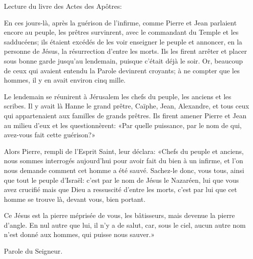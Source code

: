 \indent Lecture du livre des Actes des Apôtres:

En ces jours-là, après la guérison de l’infirme, comme Pierre et Jean parlaient encore au peuple, les prêtres survinrent, avec le commandant du Temple et les sadducéens; ils étaient excédés de les voir enseigner le peuple et annoncer, en la personne de Jésus, la résurrection d’entre les morts. Ils les firent arrêter et placer sous bonne garde jusqu’au lendemain, puisque c’était déjà le soir. Or, beaucoup de ceux qui avaient entendu la Parole devinrent croyants; à ne compter que les hommes, il y en avait environ cinq mille.

Le lendemain se réunirent à Jérusalem les chefs du peuple, les anciens et les scribes. Il y avait là Hanne le grand prêtre, Caïphe, Jean, Alexandre, et tous ceux qui appartenaient aux familles de grands prêtres. Ils firent amener Pierre et Jean au milieu d’eux et les questionnèrent: «Par quelle puissance, par le nom de qui, avez-vous fait cette guérison?»

Alors Pierre, rempli de l’Esprit Saint, leur déclara: «Chefs du peuple et anciens, nous sommes interrogés aujourd’hui pour avoir fait du bien à un infirme, et l’on nous demande comment cet homme a été sauvé. Sachez-le donc, vous tous, ainsi que tout le peuple d’Israël: c’est par le nom de Jésus le Nazaréen, lui que vous avez crucifié mais que Dieu a ressuscité d’entre les morts, c’est par lui que cet homme se trouve là, devant vous, bien portant.

Ce Jésus est la pierre méprisée de vous, les bâtisseurs, mais devenue la pierre d’angle. En nul autre que lui, il n’y a de salut, car, sous le ciel, aucun autre nom n’est donné aux hommes, qui puisse nous sauver.»

Parole du Seigneur.